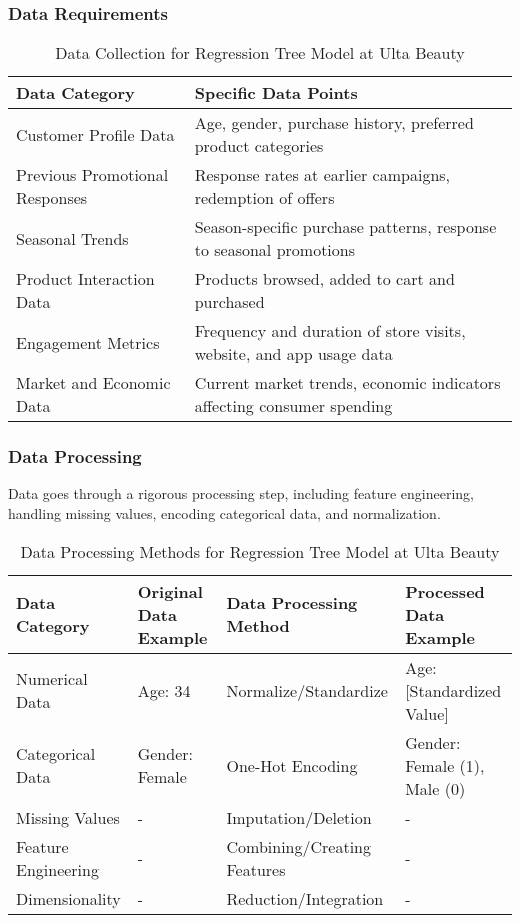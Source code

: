 \documentclass{article}
\begin{document}
\subsubsection{Data Requirements}
\label{sec:data_requirements}
\begin{table}[H]
\centering
\begin{tabular}{|l|l|}
\hline
\textbf{Data Category} & \textbf{Specific Data Points} \\
\hline
Customer Profile Data & Age, gender, purchase history, preferred product categories \\
\hline
Previous Promotional Responses & Response rates at earlier campaigns, redemption of offers \\
\hline
Seasonal Trends & Season-specific purchase patterns, response to seasonal promotions \\
\hline
Product Interaction Data & Products browsed, added to cart and purchased \\
\hline
Engagement Metrics & Frequency and duration of store visits, website, and app usage data \\
\hline
Market and Economic Data & Current market trends, economic indicators affecting consumer spending \\
\hline
\end{tabular}
\caption{Data Collection for Regression Tree Model at Ulta Beauty}
\label{table:data_collection_regression}
\end{table}

\subsubsection{Data Processing}
\label{sec:data_processing}
Data goes through a rigorous processing step, including feature engineering, handling missing values, encoding categorical data, and normalization.

\begin{table}[h]
\centering
\begin{tabular}{|l|l|l|l|}
\hline
\textbf{Data Category} & \textbf{Original Data Example} & \textbf{Data Processing Method} & \textbf{Processed Data Example} \\
\hline
Numerical Data & Age: 34 & Normalize/Standardize & Age: [Standardized Value] \\
\hline
Categorical Data & Gender: Female & One-Hot Encoding & Gender: Female (1), Male (0) \\
\hline
Missing Values & - & Imputation/Deletion & - \\
\hline
Feature Engineering & - & Combining/Creating Features & - \\
\hline
Dimensionality & - & Reduction/Integration & - \\
\hline
\end{tabular}
\caption{Data Processing Methods for Regression Tree Model at Ulta Beauty}
\label{table:data_processing_regression}
\end{table}
\end{document}
